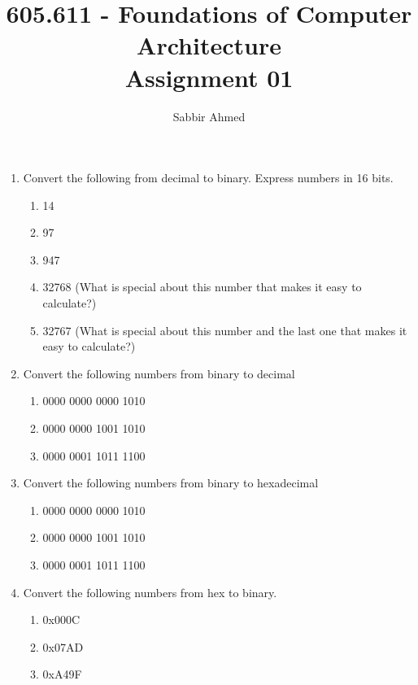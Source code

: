 \documentclass[12pt]{article}
\begin{document}
  \title{605.611 - Foundations of Computer Architecture \\ Assignment 01\vspace{-0.5em}}
  \author{Sabbir Ahmed}
  \maketitle
  \vspace{-1em}

  \begin{enumerate}

    \item Convert the following from decimal to binary. Express numbers in 16 bits.
    \begin{enumerate}
      \item 14
      \item 97
      \item 947
      \item 32768 (What is special about this number that makes it easy to calculate?)
      \item 32767 (What is special about this number and the last one that makes it easy to calculate?)
    \end{enumerate}

    \item Convert the following numbers from binary to decimal
    \begin{enumerate}
      \item 0000 0000 0000 1010
      \item 0000 0000 1001 1010
      \item 0000 0001 1011 1100
    \end{enumerate}

    \item Convert the following numbers from binary to hexadecimal
    \begin{enumerate}
      \item 0000 0000 0000 1010
      \item 0000 0000 1001 1010
      \item 0000 0001 1011 1100
    \end{enumerate}

    \item Convert the following numbers from hex to binary.
    \begin{enumerate}
      \item 0x000C
      \item 0x07AD
      \item 0xA49F
    \end{enumerate}


\end{enumerate}
\end{document}
